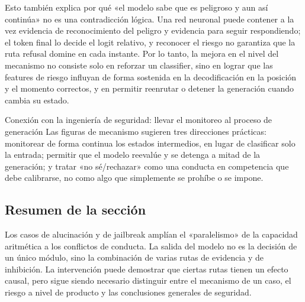 Esto también explica por qué «el modelo sabe que es peligroso y aun así continúa» no es una contradicción lógica. Una red neuronal puede contener a la vez evidencia de reconocimiento del peligro y evidencia para seguir respondiendo; el token final lo decide el logit relativo, y reconocer el riesgo no garantiza que la ruta refusal domine en cada instante. Por lo tanto, la mejora en el nivel del mecanismo no consiste solo en reforzar un classifier, sino en lograr que las features de riesgo influyan de forma sostenida en la decodificación en la posición y el momento correctos, y en permitir reenrutar o detener la generación cuando cambia su estado.

\begin{importantbox}{Conexión con la ingeniería de seguridad: llevar el monitoreo al proceso de generación}
Las figuras de mecanismo sugieren tres direcciones prácticas: monitorear de forma continua los estados intermedios, en lugar de clasificar solo la entrada; permitir que el modelo reevalúe y se detenga a mitad de la generación; y tratar «no sé/rechazar» como una conducta en competencia que debe calibrarse, no como algo que simplemente se prohíbe o se impone.
\end{importantbox}


\subsection{Resumen de la sección}

Los casos de alucinación y de jailbreak amplían el «paralelismo» de la capacidad aritmética a los conflictos de conducta. La salida del modelo no es la decisión de un único módulo, sino la combinación de varias rutas de evidencia y de inhibición. La intervención puede demostrar que ciertas rutas tienen un efecto causal, pero sigue siendo necesario distinguir entre el mecanismo de un caso, el riesgo a nivel de producto y las conclusiones generales de seguridad.
